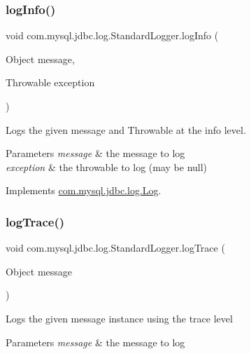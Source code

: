 \subsubsection{\texorpdfstring{log\+Info()}{logInfo()}\hspace{0.1cm}{\footnotesize\ttfamily [2/2]}}
{\footnotesize\ttfamily void com.\+mysql.\+jdbc.\+log.\+Standard\+Logger.\+log\+Info (\begin{DoxyParamCaption}\item[{Object}]{message,  }\item[{Throwable}]{exception }\end{DoxyParamCaption})}

Logs the given message and Throwable at the \textquotesingle{}info\textquotesingle{} level.


\begin{DoxyParams}{Parameters}
{\em message} & the message to log \\
\hline
{\em exception} & the throwable to log (may be null) \\
\hline
\end{DoxyParams}


Implements \mbox{\hyperlink{interfacecom_1_1mysql_1_1jdbc_1_1log_1_1_log_a577190d2919e07471dcd29d57eebee30}{com.\+mysql.\+jdbc.\+log.\+Log}}.

\mbox{\label{classcom_1_1mysql_1_1jdbc_1_1log_1_1_standard_logger_af35b306462374638f8dc0fb03ae66965}} 
\subsubsection{\texorpdfstring{log\+Trace()}{logTrace()}\hspace{0.1cm}{\footnotesize\ttfamily [1/2]}}
{\footnotesize\ttfamily void com.\+mysql.\+jdbc.\+log.\+Standard\+Logger.\+log\+Trace (\begin{DoxyParamCaption}\item[{Object}]{message }\end{DoxyParamCaption})}

Logs the given message instance using the \textquotesingle{}trace\textquotesingle{} level


\begin{DoxyParams}{Parameters}
{\em message} & the message to log \\
\hline
\end{DoxyParams}


